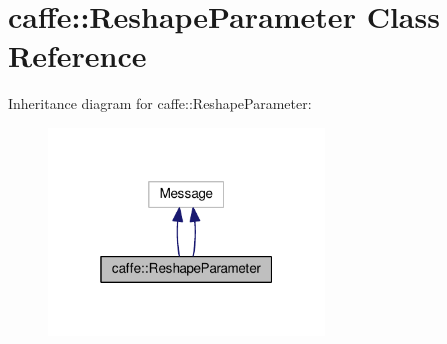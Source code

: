 \hypertarget{classcaffe_1_1_reshape_parameter}{}\section{caffe\+:\+:Reshape\+Parameter Class Reference}
\label{classcaffe_1_1_reshape_parameter}


Inheritance diagram for caffe\+:\+:Reshape\+Parameter\+:
\nopagebreak
\begin{figure}[H]
\begin{center}
\leavevmode
\includegraphics[width=208pt]{classcaffe_1_1_reshape_parameter__inherit__graph}
\end{center}
\end{figure}
